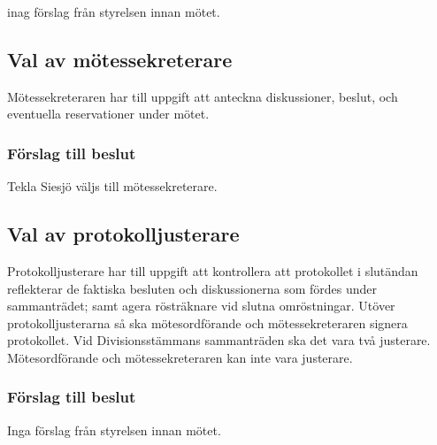 \documentclass[protokoll]{dvd}
\begin{document}
\begin{attsatser}
    \item inag förslag från styrelsen innan mötet.
\end{attsatser}

\subsection{Val av mötessekreterare}

Mötessekreteraren har till uppgift att anteckna diskussioner, beslut, och eventuella reservationer under mötet.

\subsubsection*{Förslag till beslut}

\begin{attsatser}
    \item Tekla Siesjö väljs till mötessekreterare.
\end{attsatser}

\subsection{Val av protokolljusterare}

Protokolljusterare har till uppgift att kontrollera att protokollet i slutändan reflekterar de faktiska besluten och diskussionerna som fördes under sammanträdet; samt agera rösträknare vid slutna omröstningar.
Utöver protokolljusterarna så ska mötesordförande och mötessekreteraren signera protokollet.
Vid Divisionsstämmans sammanträden ska det vara två justerare.
Mötesordförande och mötessekreteraren kan inte vara justerare.

\subsubsection*{Förslag till beslut}

\begin{attsatser}
    \item Inga förslag från styrelsen innan mötet.
\end{attsatser}

\newpage

\end{document}
